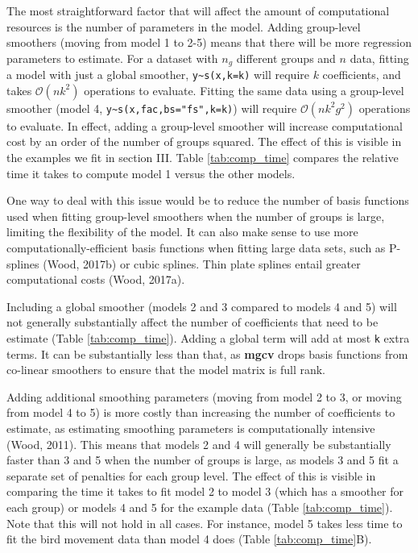 \documentclass[12pt]{article}
\begin{document}
The most straightforward factor that will affect the amount of
computational resources is the number of parameters in the model. Adding
group-level smoothers (moving from model 1 to 2-5) means that there will
be more regression parameters to estimate. For a dataset with \(n_g\)
different groups and \(n\) data, fitting a model with just a global
smoother, \texttt{y\textasciitilde{}s(x,k=k)} will require \(k\)
coefficients, and takes \(\mathcal{O}(nk^2)\) operations to evaluate.
Fitting the same data using a group-level smoother (model 4,
\texttt{y\textasciitilde{}s(x,fac,bs="fs",k=k)}) will require
\(\mathcal{O}(nk^2g^2)\) operations to evaluate. In effect, adding a
group-level smoother will increase computational cost by an order of the
number of groups squared. The effect of this is visible in the examples
we fit in section III. Table \ref{tab:comp_time} compares the relative
time it takes to compute model 1 versus the other models.

One way to deal with this issue would be to reduce the number of basis
functions used when fitting group-level smoothers when the number of
groups is large, limiting the flexibility of the model. It can also make
sense to use more computationally-efficient basis functions when fitting
large data sets, such as P-splines (Wood, 2017b) or cubic splines. Thin
plate splines entail greater computational costs (Wood, 2017a).

Including a global smoother (models 2 and 3 compared to models 4 and 5)
will not generally substantially affect the number of coefficients that
need to be estimate (Table \ref{tab:comp_time}). Adding a global term
will add at most \texttt{k} extra terms. It can be substantially less
than that, as \textbf{mgcv} drops basis functions from co-linear
smoothers to ensure that the model matrix is full rank.

Adding additional smoothing parameters (moving from model 2 to 3, or
moving from model 4 to 5) is more costly than increasing the number of
coefficients to estimate, as estimating smoothing parameters is
computationally intensive (Wood, 2011). This means that models 2 and 4
will generally be substantially faster than 3 and 5 when the number of
groups is large, as models 3 and 5 fit a separate set of penalties for
each group level. The effect of this is visible in comparing the time it
takes to fit model 2 to model 3 (which has a smoother for each group) or
models 4 and 5 for the example data (Table \ref{tab:comp_time}). Note
that this will not hold in all cases. For instance, model 5 takes less
time to fit the bird movement data than model 4 does (Table
\ref{tab:comp_time}B).
\end{document}
